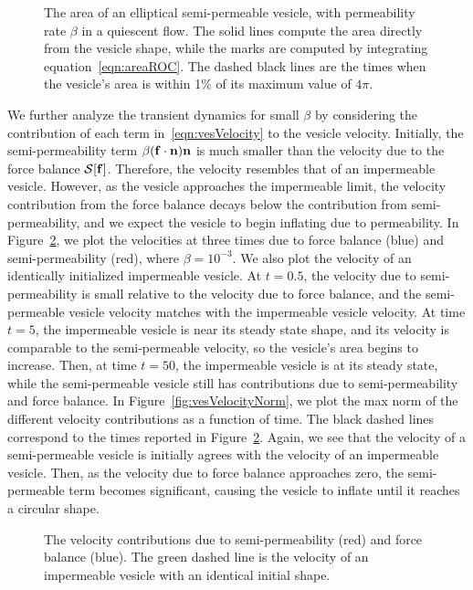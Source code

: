 \documentclass[aps,prl,showpacs]{revtex4}
\newif\ifTikz
\begin{document}
\begin{figure}[htp]
\centering

  \caption{\label{fig:ellipseArea} The area of an elliptical
  semi-permeable vesicle, with permeability rate $\beta$ in a quiescent
  flow. The solid lines compute the area directly from the vesicle
  shape, while the marks are computed by integrating
  equation~\eqref{eqn:areaROC}. The dashed black lines are the times
  when the vesicle's area is within 1\% of its maximum value of $4\pi$.}
\end{figure}

We further analyze the transient dynamics for small $\beta$ by
considering the contribution of each term in~\eqref{eqn:vesVelocity} to
the vesicle velocity. Initially, the semi-permeability term $\beta(\mathbf{f}
\cdot \mathbf{n})\mathbf{n}$ is much smaller than the velocity due to the force
balance $\mathcal{S}[\mathbf{f}]$. Therefore, the velocity resembles that of an
impermeable vesicle.  However, as the vesicle approaches the impermeable
limit, the velocity contribution from the force balance decays below the
contribution from semi-permeability, and we expect the vesicle to begin
inflating due to permeability. In Figure~\ref{fig:vesVelocity}, we plot
the velocities at three times due to force balance (blue) and
semi-permeability (red), where $\beta = 10^{-3}$. We also plot the
velocity of an identically initialized impermeable vesicle. At $t=0.5$,
the velocity due to semi-permeability is small relative to the velocity
due to force balance, and the semi-permeable vesicle velocity matches
with the impermeable vesicle velocity. At time $t=5$, the impermeable
vesicle is near its steady state shape, and its velocity is comparable
to the semi-permeable velocity, so the vesicle's area begins to
increase. Then, at time $t=50$, the impermeable vesicle is at its steady
state, while the semi-permeable vesicle still has contributions due to
semi-permeability and force balance. In
Figure~\ref{fig:vesVelocityNorm}, we plot the max norm of the different
velocity contributions as a function of time. The black dashed lines
correspond to the times reported in Figure~\ref{fig:vesVelocity}. Again,
we see that the velocity of a semi-permeable vesicle is initially agrees
with the velocity of an impermeable vesicle. Then, as the velocity due
to force balance approaches zero, the semi-permeable term becomes
significant, causing the vesicle to inflate until it reaches a circular
shape.

\begin{figure}[htp]
  \centering
  
  
  
  \caption{\label{fig:vesVelocity} The velocity contributions due to
  semi-permeability (red) and force balance (blue). The green dashed
  line is the velocity of an impermeable vesicle with an identical
  initial shape.}
\end{figure}
\end{document}
